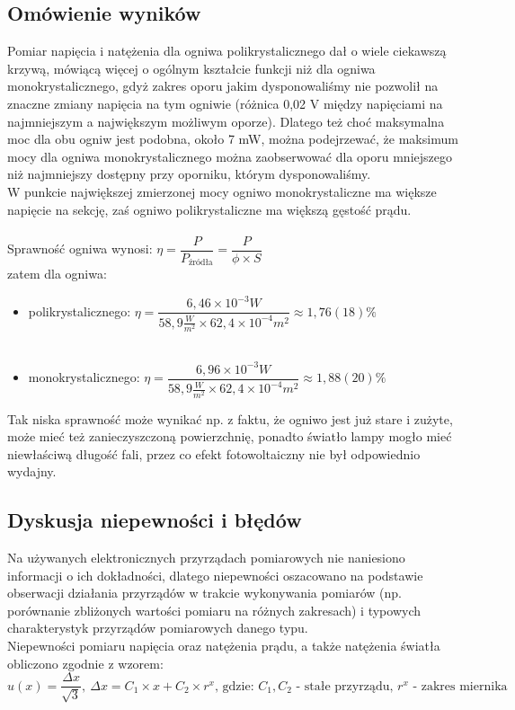 \documentclass[12pt,a4paper]{article}
\begin{document}
\subsection{Omówienie wyników}
Pomiar napięcia i natężenia dla ogniwa polikrystalicznego dał o wiele ciekawszą krzywą, mówiącą więcej o ogólnym kształcie funkcji niż dla ogniwa monokrystalicznego, gdyż zakres oporu jakim dysponowaliśmy nie pozwolił na znaczne zmiany napięcia na tym ogniwie (różnica 0,02 V między napięciami na najmniejszym a największym możliwym oporze). Dlatego też choć maksymalna moc dla obu ogniw jest podobna, około 7 mW, można podejrzewać, że maksimum mocy dla ogniwa monokrystalicznego można zaobserwować dla oporu mniejszego niż najmniejszy dostępny przy oporniku, którym dysponowaliśmy. \\
W punkcie największej zmierzonej mocy ogniwo monokrystaliczne ma większe napięcie na sekcję, zaś ogniwo polikrystaliczne ma większą gęstość prądu.\\\\
Sprawność ogniwa wynosi:
$\eta = \dfrac{P}{P_{\text{źródła}}} = \dfrac{P}{\phi \times S}$ \\
zatem dla ogniwa:\\
\begin{itemize}
\item polikrystalicznego:
$\eta = \dfrac{6,46 \times 10^{-3} W}{58,9 \frac{W}{m^2} \times 62,4 \times 10^{-4} m^2} \approx 1,76(18) \%$ \\\\
\item monokrystalicznego:
$\eta = \dfrac{6,96 \times 10^{-3} W}{58,9 \frac{W}{m^2} \times 62,4 \times 10^{-4} m^2} \approx 1,88(20) \% $
\end{itemize}
Tak niska sprawność może wynikać np. z faktu, że ogniwo jest już stare i zużyte, może mieć też zanieczyszczoną powierzchnię, ponadto światło lampy mogło mieć niewłaściwą długość fali, przez co efekt fotowoltaiczny nie był odpowiednio wydajny.

\subsection{Dyskusja niepewności i błędów}
Na używanych elektronicznych przyrządach pomiarowych nie naniesiono informacji o ich dokładności, dlatego niepewności oszacowano na podstawie obserwacji działania przyrządów w trakcie wykonywania pomiarów (np. porównanie zbliżonych wartości pomiaru na różnych zakresach) i typowych charakterystyk przyrządów pomiarowych danego typu.\\
Niepewności pomiaru napięcia oraz natężenia prądu, a także natężenia światła obliczono zgodnie z wzorem:
$$u(x) = \frac{\Delta x}{\sqrt{3}},\ \Delta x = C_1 \times x + C_2 \times r^x
\text{, gdzie: $C_1, C_2$ - stałe przyrządu, $r^x$ - zakres miernika}$$
\end{document}
